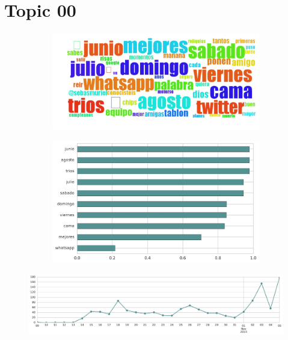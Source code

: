\clearpage

\section{Topic 00}

\begin{figure}[htbp!]
    \centering
    \begin{subfigure}[b]{0.49\textwidth}
        \includegraphics[width=\textwidth]{twitter_all/report_images/topic-00-wordcloud.jpg}
    \end{subfigure}
    \begin{subfigure}[b]{0.49\textwidth}
        \includegraphics[width=\textwidth]{twitter_all/report_images/topic-00-terms.jpg}
    \end{subfigure}
\end{figure}

\begin{figure}[htbp!]
    \centering
    \includegraphics[width=\textwidth]{twitter_all/report_images/topic-00-timeseries.jpg}
\end{figure}

